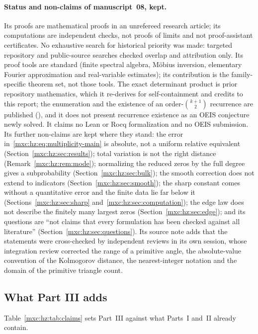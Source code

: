 \documentclass[11pt]{article}
\numberwithin{equation}{section}
\theoremstyle{definition}
\theoremstyle{remark}
\begin{document}
\paragraph{Status and non-claims of manuscript~08, kept.} Its proofs are
mathematical proofs in an unrefereed research article; its computations
are independent checks, not proofs of limits and not proof-assistant
certificates. No exhaustive search for historical priority was made:
targeted repository and public-source searches checked overlap and
attribution only. Its proof tools are standard (finite spectral algebra,
M\"obius inversion, elementary Fourier approximation and real-variable
estimates); its contribution is the family-specific theorem set, not those
tools. The exact determinant product is prior repository mathematics, which
it re-derives for self-containment and credits to this report; the
enumeration and the existence of an order-$\binom{k+1}2$ recurrence are
published (\cite[Proposition~25]{mpr2009}), and it does not present
recurrence existence as an OEIS conjecture newly solved. It claims no
Lean or Rocq formalization and no OEIS submission. Its further non-claims
are kept where they stand: the error in~\eqref{mxc:hz:eq:multiplicity-main}
is absolute, not a uniform relative equivalent
(Section~\ref{mxc:hz:sec:results}); total variation is not the right
distance (Remark~\ref{mxc:hz:rem:mode}); normalizing the reduced zeros by
the full degree gives a subprobability (Section~\ref{mxc:hz:sec:bulk});
the smooth correction does not extend to indicators
(Section~\ref{mxc:hz:sec:smooth}); the sharp constant comes without a
quantitative error and the finite data lie far below it
(Sections~\ref{mxc:hz:sec:sharp} and~\ref{mxc:hz:sec:computation}); the
edge law does not describe the finitely many largest zeros
(Section~\ref{mxc:hz:sec:edge}); and its questions are ``not claims that
every formulation has been checked against all literature''
(Section~\ref{mxc:hz:sec:questions}). Its source note adds that the
statements were cross-checked by independent reviews in its own session,
whose integration review corrected the range of a primitive angle, the
absolute-value convention of the Kolmogorov distance, the nearest-integer
notation and the domain of the primitive triangle count.

\subsection{What Part III adds}
Table~\ref{mxc:hz:tab:claims} sets Part~III against what Parts~I and~II
already contain.
\end{document}
